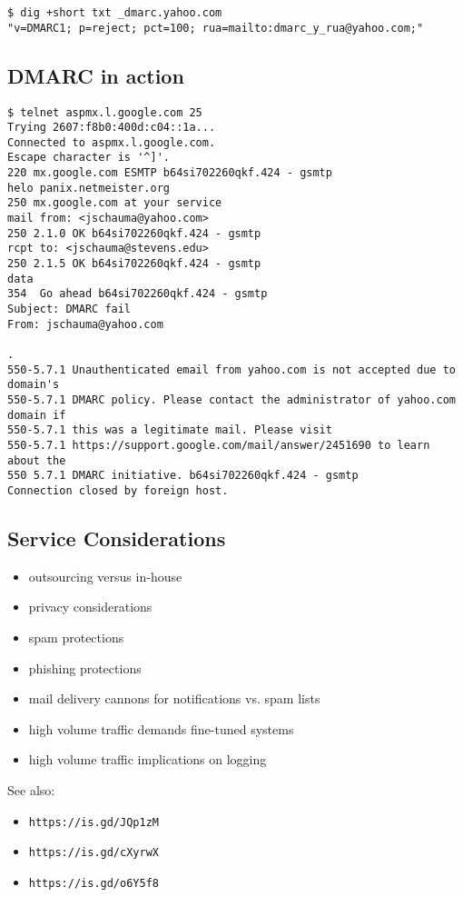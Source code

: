 \documentclass[xga]{xdvislides}
\begin{document}
\begin{verbatim}
$ dig +short txt _dmarc.yahoo.com
"v=DMARC1; p=reject; pct=100; rua=mailto:dmarc_y_rua@yahoo.com;"
\end{verbatim}

\subsection{DMARC in action}
\smallish
\begin{verbatim}
$ telnet aspmx.l.google.com 25
Trying 2607:f8b0:400d:c04::1a...
Connected to aspmx.l.google.com.
Escape character is '^]'.
220 mx.google.com ESMTP b64si702260qkf.424 - gsmtp
helo panix.netmeister.org
250 mx.google.com at your service
mail from: <jschauma@yahoo.com>
250 2.1.0 OK b64si702260qkf.424 - gsmtp
rcpt to: <jschauma@stevens.edu>
250 2.1.5 OK b64si702260qkf.424 - gsmtp
data
354  Go ahead b64si702260qkf.424 - gsmtp
Subject: DMARC fail
From: jschauma@yahoo.com

.
550-5.7.1 Unauthenticated email from yahoo.com is not accepted due to domain's
550-5.7.1 DMARC policy. Please contact the administrator of yahoo.com domain if
550-5.7.1 this was a legitimate mail. Please visit
550-5.7.1 https://support.google.com/mail/answer/2451690 to learn about the
550 5.7.1 DMARC initiative. b64si702260qkf.424 - gsmtp
Connection closed by foreign host.
\end{verbatim}
\Normalsize

\subsection{Service Considerations}
\begin{itemize}
	\item outsourcing versus in-house
	\item privacy considerations
	\item spam protections
	\item phishing protections
	\item mail delivery cannons for notifications vs. spam lists
	\item high volume traffic demands fine-tuned systems
	\item high volume traffic implications on logging
\end{itemize}
\vspace{.5in}
See also:
\begin{itemize}
	\item {\tt https://is.gd/JQp1zM}
	\item {\tt https://is.gd/cXyrwX}
	\item {\tt https://is.gd/o6Y5f8}
\end{itemize}
\end{document}
